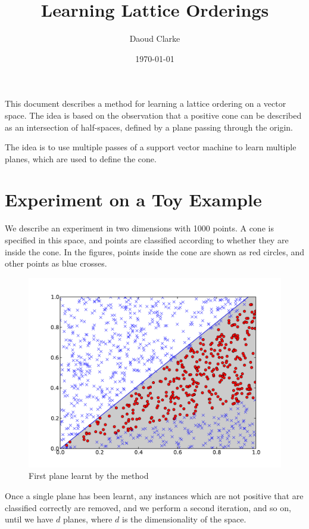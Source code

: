 \documentclass{article}
\author{Daoud Clarke}
\date{\today}
\title{Learning Lattice Orderings}
\begin{document}
\maketitle

This document describes a method for learning a lattice ordering on a
vector space. The idea is based on the observation that a positive
cone can be described as an intersection of half-spaces, defined by a
plane passing through the origin.

The idea is to use multiple passes of a support vector machine to
learn multiple planes, which are used to define the cone.

\section{Experiment on a Toy Example}

We describe an experiment in two dimensions with 1000 points. A cone
is specified in this space, and points are classified according to
whether they are inside the cone. In the figures, points inside the
cone are shown as red circles, and other points as blue crosses.

\begin{figure}%
\begin{center}
\includegraphics[scale=0.5]{first_plane.pdf}%
\caption{First plane learnt by the method}
\end{center}
\end{figure}%

Once a single plane has been learnt, any instances which are not
positive that are classified correctly are removed, and we perform a
second iteration, and so on, until we have $d$ planes, where $d$ is
the dimensionality of the space.
\end{document}
